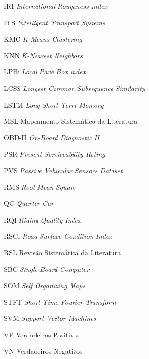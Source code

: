 \begin{siglas}
\item[IRI] \textit{International Roughness Index}
\item[ITS] \textit{Intelligent Transport Systems}
\item[KMC] \textit{K-Means Clustering}
\item[KNN] \textit{K-Nearest Neighbors}
\item[LPBi] \textit{Local Pave Box index}
\item[LCSS] \textit{Longest Common Subsequence Similarity}
\item[LSTM] \textit{Long Short-Term Memory}
\item[MSL] Mapeamento Sistemático da Literatura
\item[OBD-II] \textit{On-Board Diagnostic II}
\item[PSR] \textit{Present Serviceability Rating}
\item[PVS] \textit{Passive  Vehicular  Sensors  Dataset}
\item[RMS] \textit{Root Mean Square}
\item[QC] \textit{Quarter-Car}
\item[RQI] \textit{Riding Quality Index}
\item[RSCI] \textit{Road Surface Condition Index}
\item[RSL] Revisão Sistemática da Literatura
\item[SBC] \textit{Single-Board  Computer}
\item[SOM] \textit{Self Organizing Maps}
\item[STFT] \textit{Short-Time Fourier Transform}
\item[SVM] \textit{Support Vector Machines}
\item[VP] Verdadeiros Positivos
\item[VN] Verdadeiros Negativos
\end{siglas}
